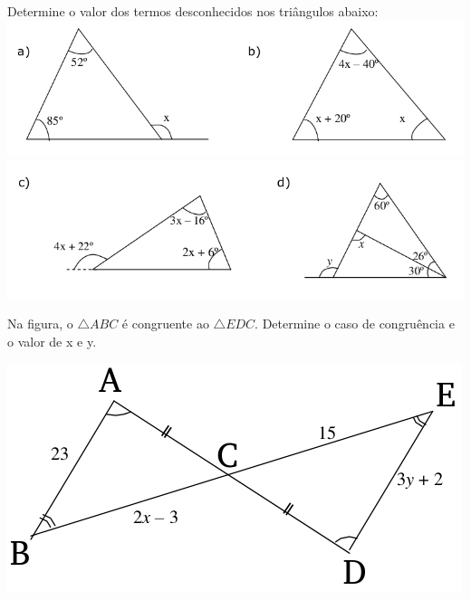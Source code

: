 			\item Determine o valor dos termos desconhecidos nos triângulos abaixo:\\
			\includegraphics[scale=0.7]{figuras/fig26.png}\\
			\includegraphics[scale=0.7]{figuras/fig27.png}
			
			\item Na figura, o $\bigtriangleup ABC$ é congruente ao $\bigtriangleup EDC$. Determine o caso de congruência e o valor de x e y.
			
			\includegraphics[scale=0.7]{figuras/fig29.png}
		
